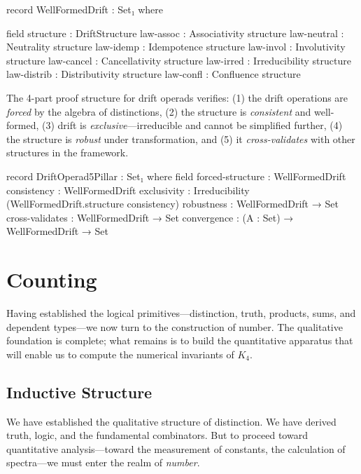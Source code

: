 \documentclass[11pt,a4paper]{book}
\begin{document}
\begin{code}
record WellFormedDrift : Set₁ where

  field
    structure : DriftStructure
    law-assoc    : Associativity structure
    law-neutral  : Neutrality structure
    law-idemp    : Idempotence structure
    law-invol    : Involutivity structure
    law-cancel   : Cancellativity structure
    law-irred    : Irreducibility structure
    law-distrib  : Distributivity structure
    law-confl    : Confluence structure

\end{code}

The 4-part proof structure for drift operads verifies: (1) the drift operations are 
\emph{forced} by the algebra of distinctions, (2) the structure is \emph{consistent} 
and well-formed, (3) drift is \emph{exclusive}---irreducible and cannot be simplified 
further, (4) the structure is \emph{robust} under transformation, and (5) it 
\emph{cross-validates} with other structures in the framework.

\begin{code}
record DriftOperad5Pillar : Set₁ where
  field
    forced-structure : WellFormedDrift
    consistency      : WellFormedDrift
    exclusivity      : Irreducibility (WellFormedDrift.structure consistency)
    robustness       : WellFormedDrift → Set
    cross-validates  : WellFormedDrift → Set
    convergence      : (A : Set) → WellFormedDrift → Set

\end{code}

\part{Counting}

Having established the logical primitives—distinction, truth, products, sums, and dependent 
types—we now turn to the construction of number. The qualitative foundation is complete; 
what remains is to build the quantitative apparatus that will enable us to compute the 
numerical invariants of $K_4$.

\chapter{Inductive Structure}

We have established the qualitative structure of distinction. We have derived truth, 
logic, and the fundamental combinators. But to proceed toward quantitative analysis—toward 
the measurement of constants, the calculation of spectra—we must enter the realm of \emph{number}.
\end{document}
